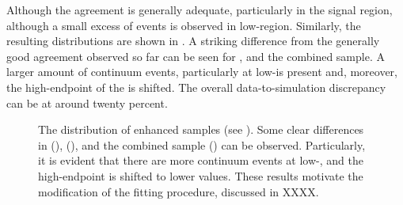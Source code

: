 Although the agreement is generally adequate, particularly in the signal region, although a small excess of events is observed in low-\EB region.
Similarly, the resulting \Mbc distributions are shown in .
A striking difference from the generally good agreement observed so far can be seen for \feiBp, \feiBz and the combined sample.
A larger amount of continuum events, particularly at low-\Mbc is present and,
moreover, the high-endpoint of the \Mbc is shifted.
The overall data-to-simulation discrepancy can be at around twenty percent.
\begin{figure}[htbp!]
    \centering
    \caption{\label{fig:qqbar_enhanced_mbc} The \Mbc distribution of \qqbar enhanced samples (see ).
    Some clear differences in \feiBp (), \feiBz (),
    and the combined sample () can be observed.
    Particularly, it is evident that there are more continuum events at low-\Mbc, and the \Mbc high-endpoint is shifted to lower values.
    These results motivate the modification of the \Mbc fitting procedure, discussed in XXXX.
    }
\end{figure}

